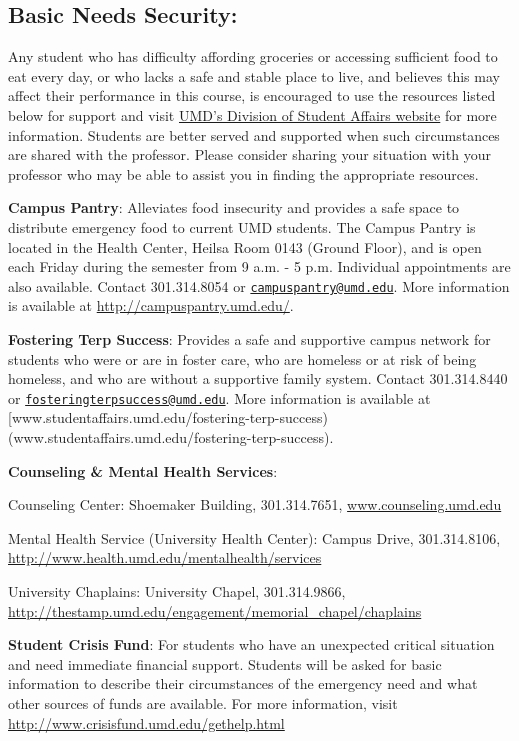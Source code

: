 \documentclass[
]{book}
\begin{document}
\hypertarget{basic-needs-security}{%
\subsection{Basic Needs Security:}\label{basic-needs-security}}

Any student who has difficulty affording groceries or accessing sufficient food to eat every day, or who lacks a safe and stable place to live, and believes this may affect their performance in this course, is encouraged to use the resources listed below for support and visit \href{https://studentaffairs.umd.edu/basic-needs-security}{UMD's Division of Student Affairs website} for more information. Students are better served and supported when such circumstances are shared with the professor. Please consider sharing your situation with your professor who may be able to assist you in finding the appropriate resources.

\textbf{Campus Pantry}: Alleviates food insecurity and provides a safe space to distribute emergency food to current UMD students. The Campus Pantry is located in the Health Center, Heilsa Room 0143 (Ground Floor), and is open each Friday during the semester from 9 a.m. - 5 p.m. Individual appointments are also available. Contact 301.314.8054 or \href{mailto:campuspantry@umd.edu}{\nolinkurl{campuspantry@umd.edu}}. More information is available at \url{http://campuspantry.umd.edu/}.

\textbf{Fostering Terp Success}: Provides a safe and supportive campus network for students who were or are in foster care, who are homeless or at risk of being homeless, and who are without a supportive family system. Contact 301.314.8440 or \href{mailto:fosteringterpsuccess@umd.edu}{\nolinkurl{fosteringterpsuccess@umd.edu}}. More information is available at {[}www.studentaffairs.umd.edu/fostering-terp-success)(www.studentaffairs.umd.edu/fostering-terp-success).

\textbf{Counseling \& Mental Health Services}:

Counseling Center: Shoemaker Building, 301.314.7651, \url{www.counseling.umd.edu}

Mental Health Service (University Health Center): Campus Drive, 301.314.8106, \url{http://www.health.umd.edu/mentalhealth/services}

University Chaplains: University Chapel, 301.314.9866, \url{http://thestamp.umd.edu/engagement/memorial_chapel/chaplains}

\textbf{Student Crisis Fund}: For students who have an unexpected critical situation and need immediate financial support. Students will be asked for basic information to describe their circumstances of the emergency need and what other sources of funds are available. For more information, visit \url{http://www.crisisfund.umd.edu/gethelp.html}
\end{document}

